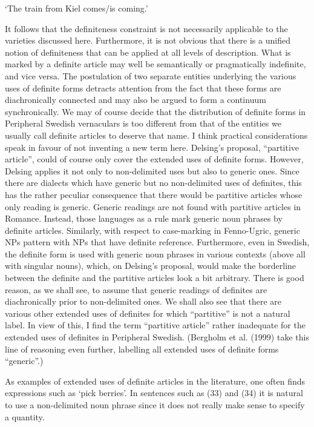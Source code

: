 ‘The train from Kiel comes/is coming.’
\z


It follows that the definiteness constraint is not necessarily applicable to the varieties discussed here. Furthermore, it is not obvious that there is a unified notion of definiteness that can be applied at all levels of description. What is marked by a definite article may well be semantically or pragmatically indefinite, and vice versa. The postulation of two separate entities underlying the various uses of definite forms detracts attention from the fact that these forms are diachronically connected and may also be argued to form a continuum synchronically. We may of course decide that the distribution of definite forms in Peripheral Swedish vernaculars is too different from that of the entities we usually call definite articles to deserve that name. I think practical considerations speak in favour of not inventing a new term here. Delsing’s proposal, “partitive article”, could of course only cover the extended uses of definite forms. However, Delsing applies it not only to non-delimited uses but also to generic ones. Since there are dialects which have generic but no non-delimited uses of definites, this has the rather peculiar consequence that there would be partitive articles whose only reading is generic. Generic readings are not found with partitive articles in Romance. Instead, those languages as a rule mark generic noun phrases by definite articles. Similarly, with respect to case-marking in Fenno-Ugric, generic NPs pattern with NPs that have definite reference. Furthermore, even in Swedish, the definite form is used with generic noun phrases in various contexts (above all with singular nouns), which, on Delsing’s proposal, would make the borderline between the definite and the partitive articles look a bit arbitrary. There is good reason, as we shall see, to assume that generic readings of definites are diachronically prior to non-delimited ones. We shall also see that there are various other extended uses of definites for which “partitive” is not a natural label. In view of this, I find the term “partitive article” rather inadequate for the extended uses of definites in Peripheral Swedish. (Bergholm et al. (1999) take this line of reasoning even further, labelling all extended uses of definite forms “generic”.)

As examples of extended uses of definite articles in the literature, one often finds expressions such as ‘pick berries’. In sentences such as (33) and (34) it is natural to use a non-delimited noun phrase since it does not really make sense to specify a quantity. 

